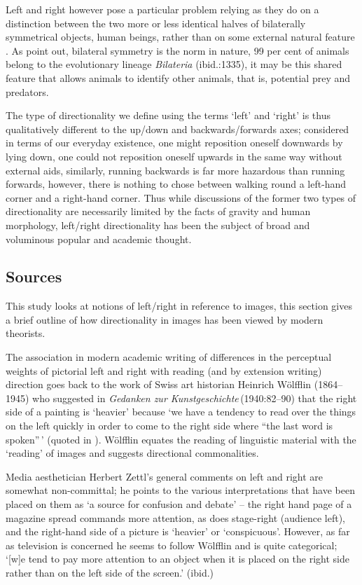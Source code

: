 \documentclass[11pt, oneside, a4paper]{scrartcl}
\begin{document}
 Left and right however pose a particular problem relying as they do on a distinction between the two more or less identical halves of bilaterally symmetrical objects, human beings, rather than on some external natural feature \citep{Gross:1978}. As \citet{Finnerty:2004} point out, bilateral symmetry is the norm in nature, 99 per cent of animals belong to the evolutionary lineage \emph{Bilateria} (ibid.:1335), it may be this shared feature that allows animals to identify other animals, that is, potential prey and predators.

The type of directionality we define using the terms `left' and `right' is thus qualitatively different to the up/down and backwards/forwards axes; considered in terms of our everyday existence, one might reposition oneself downwards by lying down, one could not reposition oneself upwards in the same way without external aids, similarly, running backwards is far more hazardous than running forwards, however, there is nothing to chose between walking round a left-hand corner and a right-hand corner. Thus while discussions of the former two types of directionality are necessarily limited by the facts of gravity and human morphology, left/right directionality has been the subject of broad and voluminous popular and academic thought. 

\subsection{Sources\label{par:precision}}
This study looks at notions of left/right in reference to images, this section gives a brief outline of how directionality in images has been viewed by modern theorists. 

The association in modern academic writing of differences in the perceptual weights of pictorial left and right with reading (and by extension writing) direction goes back to the work of Swiss art historian Heinrich W\"{o}lfflin (1864--1945) who suggested in \emph{Gedanken zur Kunstgeschichte}\,(1940:82--90)\nocite{Wolfflin:1940} that the right side of a painting is `heavier' because `we have a tendency to read over the things on the left quickly in order to come to the right side where ``the last word is spoken''\,' (quoted in \citet[128]{Zettl:1973}). W\"{o}lfflin equates the reading of linguistic material with the `reading' of images and suggests directional commonalities.

Media aesthetician Herbert Zettl's general comments on left and right are somewhat non-committal; he points to the various interpretations that have been placed on them as `a source for confusion and debate' -- the right hand page of a magazine spread commands more attention, as does stage-right (audience left), and the right-hand side of a picture is `heavier' or `conspicuous'. However, as far as television is concerned he seems to follow W\"{o}lfflin and is quite categorical; `[w]e tend to pay more attention to an object when it is placed on the right side rather than on the left side of the screen.' (ibid.)
\end{document}
